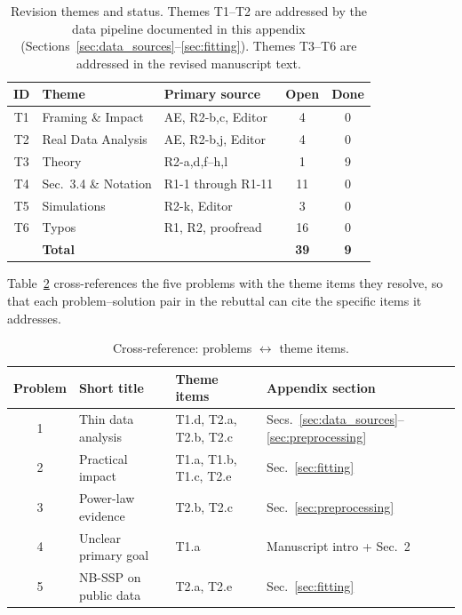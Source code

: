 \begin{table}[H]
\centering
\caption{Revision themes and status.
Themes T1--T2 are addressed by the data pipeline documented
in this appendix (Sections~\ref{sec:data_sources}--\ref{sec:fitting}).
Themes T3--T6 are addressed in the revised manuscript text.}
\label{tab:themes}
\small
\begin{tabular}{@{}clp{3.2cm}cc@{}}
\toprule
\textbf{ID} & \textbf{Theme} & \textbf{Primary source} &
\textbf{Open} & \textbf{Done} \\
\midrule
T1 & Framing \& Impact & AE, R2-b,c, Editor & 4 & 0 \\
T2 & Real Data Analysis & AE, R2-b,j, Editor & 4 & 0 \\
T3 & Theory & R2-a,d,f--h,l & 1 & 9 \\
T4 & Sec.~3.4 \& Notation & R1-1 through R1-11 & 11 & 0 \\
T5 & Simulations & R2-k, Editor & 3 & 0 \\
T6 & Typos & R1, R2, proofread & 16 & 0 \\
\midrule
   & \textbf{Total} & & \textbf{39} & \textbf{9} \\
\bottomrule
\end{tabular}
\end{table}

Table~\ref{tab:problem_theme_map} cross-references the five
problems with the theme items they resolve, so that each
problem--solution pair in the rebuttal can cite the specific
items it addresses.

\begin{table}[H]
\centering
\caption{Cross-reference: problems $\leftrightarrow$ theme items.}
\label{tab:problem_theme_map}
\small
\begin{tabular}{@{}clll@{}}
\toprule
\textbf{Problem} & \textbf{Short title} &
\textbf{Theme items} & \textbf{Appendix section} \\
\midrule
1 & Thin data analysis &
  T1.d, T2.a, T2.b, T2.c &
  Secs.~\ref{sec:data_sources}--\ref{sec:preprocessing} \\
2 & Practical impact &
  T1.a, T1.b, T1.c, T2.e &
  Sec.~\ref{sec:fitting} \\
3 & Power-law evidence &
  T2.b, T2.c &
  Sec.~\ref{sec:preprocessing} \\
4 & Unclear primary goal &
  T1.a &
  Manuscript intro + Sec.~2 \\
5 & NB-SSP on public data &
  T2.a, T2.e &
  Sec.~\ref{sec:fitting} \\
\bottomrule
\end{tabular}
\end{table}



